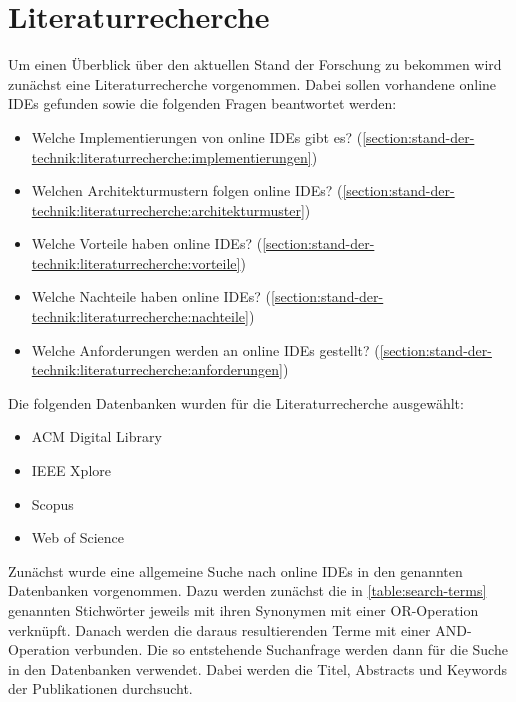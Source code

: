 \section{Literaturrecherche}\label{section:stand-der-technik:literaturrecherche}

Um einen Überblick über den aktuellen Stand der Forschung zu bekommen wird zunächst eine Literaturrecherche vorgenommen. Dabei sollen vorhandene online IDEs gefunden sowie die folgenden Fragen beantwortet werden:

\begin{itemize}
    \item Welche Implementierungen von online IDEs gibt es? \hfill (\autoref{section:stand-der-technik:literaturrecherche:implementierungen})
    \item Welchen Architekturmustern folgen online IDEs? \hfill (\autoref{section:stand-der-technik:literaturrecherche:architekturmuster})
    \item Welche Vorteile haben online IDEs? \hfill (\autoref{section:stand-der-technik:literaturrecherche:vorteile})
    \item Welche Nachteile haben online IDEs? \hfill (\autoref{section:stand-der-technik:literaturrecherche:nachteile})
    \item Welche Anforderungen werden an online IDEs gestellt? \hfill (\autoref{section:stand-der-technik:literaturrecherche:anforderungen})
\end{itemize}

Die folgenden Datenbanken wurden für die Literaturrecherche ausgewählt:

\begin{itemize}
    \item ACM Digital Library 
    \item IEEE Xplore 
    \item Scopus 
    \item Web of Science 
\end{itemize}

Zunächst wurde eine allgemeine Suche nach online IDEs in den genannten Datenbanken vorgenommen. Dazu werden zunächst die in \autoref{table:search-terms} genannten Stichwörter jeweils mit ihren Synonymen mit einer OR-Operation verknüpft. Danach werden die daraus resultierenden Terme mit einer AND-Operation verbunden. Die so entstehende Suchanfrage werden dann für die Suche in den Datenbanken verwendet. Dabei werden die Titel, Abstracts und Keywords der Publikationen durchsucht.

